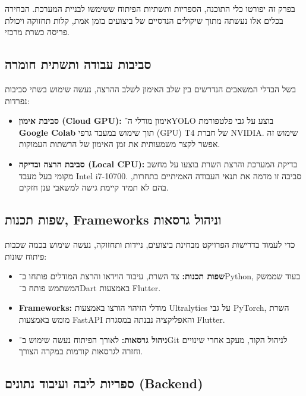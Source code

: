 בפרק זה יפורטו כלי התוכנה, הספריות ותשתיות הפיתוח ששימשו לבניית
המערכת. הבחירה בכלים אלו נעשתה מתוך שיקולים הנדסיים של ביצועים בזמן
אמת, קלות תחזוקה ויכולת פריסה כשרת מרכזי.

\subsection{סביבות עבודה ותשתית חומרה}

בשל הבדלי המשאבים הנדרשים בין
שלב האימון לשלב ההרצה, נעשה שימוש בשתי סביבות נפרדות:
\begin{itemize}
\item \textbf{סביבת אימון (\textenglish{Cloud GPU}):} אימון מודלי
  ה־\textenglish{YOLO} בוצע על גבי פלטפורמת \textbf{\textenglish{Google
      Colab}} תוך שימוש במעבד גרפי (\textenglish{GPU}) \textenglish{T4} של חברת
  \textenglish{NVIDIA}. שימוש זה אפשר לקצר משמעותית את זמן האימון של
  הרשתות העמוקות.
\item \textbf{סביבת הרצה ובדיקה (\textenglish{Local CPU}):} בדיקת
  המערכת והרצת השרת בוצעו על מחשב מקומי בעל מעבד \textenglish{Intel
    i7-10700}. סביבה זו מדמה את תנאי העבודה האמיתיים בתחרות, בהם לא תמיד
  קיימת גישה למשאבי ענן חזקים.
\end{itemize}

\subsection{שפות תכנות, \textenglish{Frameworks} וניהול גרסאות}

כדי לעמוד בדרישות הפרויקט מבחינת ביצועים, ניידות ותחזוקה, נעשה שימוש
בכמה שכבות פיתוח שונות:
\begin{itemize}
\item \textbf{שפות תכנות:} צד השרת, עיבוד הוידאו והרצת המודלים פותחו
  ב־\textenglish{Python}, בעוד שממשק המשתמש פותח ב־\textenglish{Dart}
  באמצעות \textenglish{Flutter}.
\item \textbf{\textenglish{Frameworks}:} מודלי הזיהוי הורצו באמצעות
  \textenglish{Ultralytics} על גבי \textenglish{PyTorch}, השרת מומש
  באמצעות \textenglish{FastAPI} והאפליקציה נבנתה במסגרת
  \textenglish{Flutter}.
\item \textbf{ניהול גרסאות:} לאורך הפיתוח נעשה שימוש ב־\textenglish{Git}
  לניהול הקוד, מעקב אחרי שינויים וחזרה לגרסאות קודמות במקרה הצורך.
\end{itemize}

\subsection{ספריות ליבה ועיבוד נתונים (\textenglish{Backend})}

